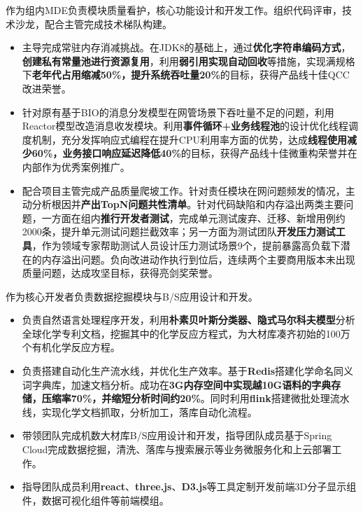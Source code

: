\documentclass{resume}
\begin{document}
\begin{onehalfspacing}
作为组内MDE负责模块质量看护，核心功能设计和开发工作。组织代码评审，技术沙龙，配合主管完成技术梯队构建。
\begin{itemize}
  \item 主导完成常驻内存消减挑战。在JDK8的基础上，通过\textbf{优化字符串编码方式}，\textbf{创建私有常量池进行资源复用}，利用\textbf{弱引用实现自动回收}等措施，实现满规格下\textbf{老年代占用缩减50\%，提升系统吞吐量20\%}的目标，获得产品线十佳QCC改进荣誉。
  \item 针对原有基于BIO的消息分发模型在网管场景下吞吐量不足的问题，利用Reactor模型改造消息收发模块。利用\textbf{事件循环+业务线程池}的设计优化线程调度机制，充分发挥响应式编程在提升CPU利用率方面的优势，达成\textbf{线程使用减少60\%，业务接口响应延迟降低40\%}的目标，获得产品线十佳微重构荣誉并在内部作为优秀案例推广。
  \item 配合项目主管完成产品质量爬坡工作。针对责任模块在网问题频发的情况，主动分析根因并\textbf{产出TopN问题共性清单}。针对代码缺陷和内存溢出两类主要问题，一方面在组内\textbf{推行开发者测试}，完成单元测试废弃、迁移、新增用例约2000条，提升单元测试问题拦截效率；另一方面为测试团队\textbf{开发压力测试工具}，作为领域专家帮助测试人员设计压力测试场景9个，提前暴露高负载下潜在的内存溢出问题。负向改进动作执行到位后，连续两个主要商用版本未出现质量问题，达成攻坚目标，获得亮剑奖荣誉。
\end{itemize}
\end{onehalfspacing}

\begin{onehalfspacing}
作为核心开发者负责数据挖掘模块与B/S应用设计和开发。
\begin{itemize}
  \item 负责自然语言处理程序开发，利用\textbf{朴素贝叶斯分类器、隐式马尔科夫模型}分析全球化学专利文档，挖掘其中的化学反应方程式，为大材库凑齐初始的100万个有机化学反应方程。
  \item 负责搭建自动化生产流水线，并优化生产效率。基于\textbf{Redis}搭建化学命名同义词字典库，加速文档分析。成功在\textbf{3G内存空间中实现越10G语料的字典存储，压缩率70\%，并缩短分析时间约20\%}。同时利用\textbf{flink}搭建微批处理流水线，实现化学文档抓取，分析加工，落库自动化流程。
  \item 带领团队完成机数大材库B/S应用设计和开发，指导团队成员基于Spring Cloud完成数据挖掘，清洗、落库与搜索展示等业务微服务化和上云部署工作。
  \item 指导团队成员利用\textbf{react}、\textbf{three.js}、\textbf{D3.js}等工具定制开发前端3D分子显示组件，数据可视化组件等前端模组。
\end{itemize}
\end{onehalfspacing}
\end{document}
